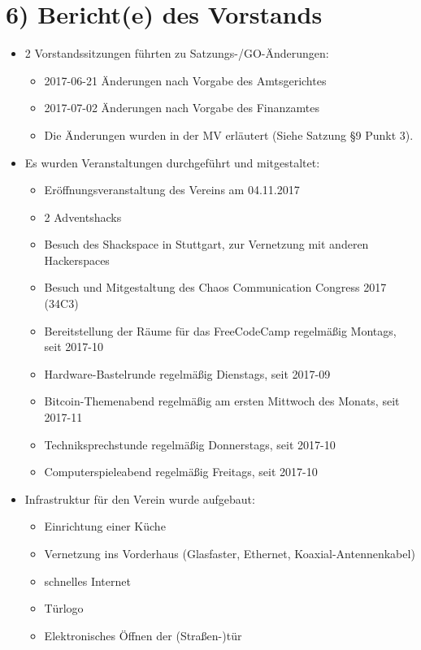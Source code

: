 \documentclass[10pt,a4paper]{scrartcl}
\begin{document}
\section*{6) Bericht(e) des Vorstands}
	\begin{itemize}
		\item 2 Vorstandssitzungen f{\"u}hrten zu Satzungs-/GO-{\"A}nderungen:
		\begin{itemize}
			\item 2017-06-21 {\"A}nderungen nach Vorgabe des Amtsgerichtes
			\item 2017-07-02 {\"A}nderungen nach Vorgabe des Finanzamtes
			\item Die {\"A}nderungen wurden in der MV erl{\"a}utert (Siehe Satzung §9 Punkt 3).
		\end{itemize}
	
		\item Es wurden Veranstaltungen durchgef{\"u}hrt und mitgestaltet:
		\begin{itemize}
			\item Er{\"o}ffnungsveranstaltung des Vereins am 04.11.2017
			\item 2 Adventshacks
			\item Besuch des Shackspace in Stuttgart, zur Vernetzung mit anderen Hackerspaces
			\item Besuch und Mitgestaltung des Chaos Communication Congress 2017 (34C3)
			\item Bereitstellung der R{\"a}ume f{\"u}r das FreeCodeCamp regelm{\"a}{\ss}ig Montags, seit 2017-10
			\item Hardware-Bastelrunde regelm{\"a}{\ss}ig Dienstags, seit 2017-09
			\item Bitcoin-Themenabend regelm{\"a}{\ss}ig am ersten Mittwoch des Monats, seit 2017-11
			\item Techniksprechstunde regelm{\"a}{\ss}ig Donnerstags, seit 2017-10
			\item Computerspieleabend regelm{\"a}{\ss}ig Freitags, seit 2017-10
		\end{itemize}

		\item Infrastruktur f{\"u}r den Verein wurde aufgebaut:
		\begin{itemize}
			\item Einrichtung einer K{\"u}che
			\item Vernetzung ins Vorderhaus (Glasfaster, Ethernet, Koaxial-Antennenkabel)
			\item schnelles Internet
			\item T{\"u}rlogo
			\item Elektronisches {\"O}ffnen der (Stra{\ss}en-)t{\"u}r
		\end{itemize}


\end{itemize}
\end{document}

